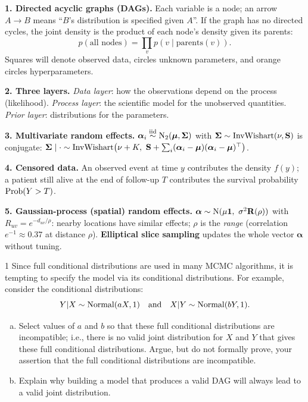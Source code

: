 \documentclass[11pt]{article}
\begin{document}
\begin{recall}
\textbf{1. Directed acyclic graphs (DAGs).} Each variable is a node; an arrow $A\to B$ means ``$B$'s distribution is specified given $A$''. If the graph has no directed cycles, the joint density is the product of each node's density given its parents:
\[
p(\text{all nodes})=\prod_{v}p(v\mid\text{parents}(v)).
\]
Squares will denote observed data, circles unknown parameters, and orange circles hyperparameters.

\medskip
\textbf{2. Three layers.} \emph{Data layer}: how the observations depend on the process (likelihood). \emph{Process layer}: the scientific model for the unobserved quantities. \emph{Prior layer}: distributions for the parameters.

\medskip
\textbf{3. Multivariate random effects.} $\bm\alpha_i\stackrel{\text{iid}}{\sim}\mathrm{N}_2(\bm\mu,\bm\Sigma)$ with $\bm\Sigma\sim\mathrm{InvWishart}(\nu,\mathbf S)$ is conjugate: $\bm\Sigma\mid\cdot\sim\dist{InvWishart}\big(\nu+K,\ \mathbf S+\sum_i(\bm\alpha_i-\bm\mu)(\bm\alpha_i-\bm\mu)^\top\big)$.

\medskip
\textbf{4. Censored data.} An observed event at time $y$ contributes the density $f(y)$; a patient still alive at the end of follow-up $T$ contributes the survival probability $\mathrm{Prob}(Y>T)$.

\medskip
\textbf{5. Gaussian-process (spatial) random effects.} $\bm\alpha\sim\mathrm{N}(\mu\mathbf 1,\ \sigma^2\mathbf R(\rho))$ with $R_{uv}=e^{-d_{uv}/\rho}$: nearby locations have similar effects; $\rho$ is the \emph{range} (correlation $e^{-1}\approx0.37$ at distance $\rho$). \textbf{Elliptical slice sampling} updates the whole vector $\bm\alpha$ without tuning.
\end{recall}

\clearpage


\begin{problem}{1}
Since full conditional distributions are used in many MCMC algorithms, it is tempting to specify the model via its conditional distributions. For example, consider the conditional distributions:
\[
Y|X\sim\mathrm{Normal}(aX,1)\quad\text{and}\quad X|Y\sim\mathrm{Normal}(bY,1).
\]
\begin{enumerate}[(a)]
\item Select values of $a$ and $b$ so that these full conditional distributions are incompatible; i.e., there is no valid joint distribution for $X$ and $Y$ that gives these full conditional distributions. Argue, but do not formally prove, your assertion that the full conditional distributions are incompatible.
\item Explain why building a model that produces a valid DAG will always lead to a valid joint distribution.
\end{enumerate}
\end{problem}
\end{document}
